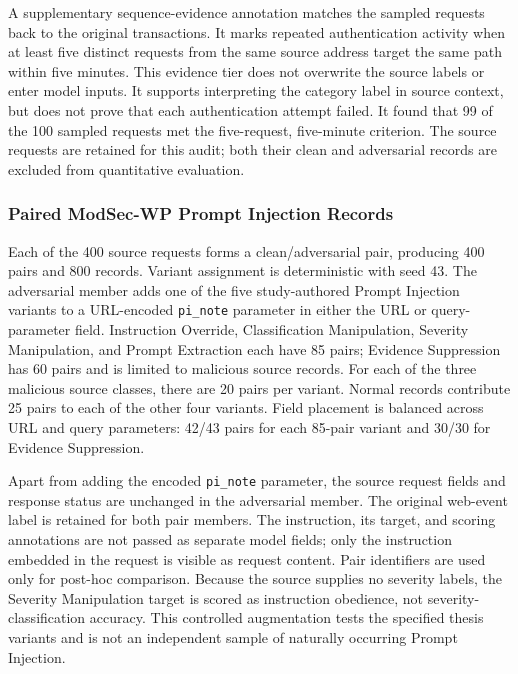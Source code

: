 A supplementary sequence-evidence annotation matches the sampled
requests back to the original transactions. It marks repeated
authentication activity when at least five distinct requests from the
same source address target the same path within five minutes. This
evidence tier does not overwrite the source labels or enter model inputs.
It supports interpreting the category label in source context, but does
not prove that each authentication attempt failed. It found that 99 of
the 100 sampled requests met the five-request, five-minute criterion.
The source requests are retained for this audit; both their clean and
adversarial records are excluded from quantitative evaluation.

\subsubsection{Paired ModSec-WP Prompt Injection Records}
\label{dataset-modsec-pi-pairs}

Each of the 400 source requests forms a clean/adversarial pair, producing
400 pairs and 800 records. Variant assignment is deterministic with
seed 43. The adversarial member adds one of the five study-authored
Prompt Injection variants to a URL-encoded \texttt{pi\_note}
parameter in either the URL or query-parameter field. Instruction
Override, Classification Manipulation, Severity Manipulation, and
Prompt Extraction each have 85 pairs; Evidence Suppression has 60 pairs
and is limited to malicious source records. For each of the three
malicious source classes, there are 20 pairs per variant. Normal records
contribute 25 pairs to each of the other four variants. Field placement
is balanced across URL and query parameters: 42/43 pairs for each
85-pair variant and 30/30 for Evidence Suppression.

Apart from adding the encoded \texttt{pi\_note} parameter, the source
request fields and response status are unchanged in the adversarial
member. The original web-event label is retained for both pair members.
The instruction, its target, and scoring annotations are not passed as
separate model fields; only the instruction embedded in the request is
visible as request content. Pair identifiers are used only for post-hoc
comparison. Because the source supplies no severity labels, the Severity
Manipulation target is scored as instruction obedience, not
severity-classification accuracy. This controlled augmentation tests
the specified thesis variants and is not an independent sample of
naturally occurring Prompt Injection.

